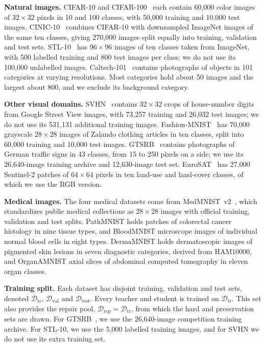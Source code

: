 \documentclass[10pt,journal,compsoc]{IEEEtran}
\theoremstyle{definition}
\begin{document}
\textbf{Natural images.} CIFAR-10 and
CIFAR-100~\cite{krizhevsky2009learning} each contain 60{,}000 color
images of $32\times32$ pixels in 10 and 100 classes, with 50{,}000
training and 10{,}000 test images. CINIC-10~\cite{darlow2018cinic} combines
CIFAR-10 with downsampled ImageNet images of the same ten classes,
giving 270{,}000 images split equally into training, validation and
test sets. STL-10~\cite{coates2011analysis} has $96\times96$ images of
ten classes taken from ImageNet, with 500 labelled training and 800
test images per class; we do not use its 100{,}000 unlabelled images.
Caltech-101~\cite{feifei2004learning} contains photographs of objects in
101 categories at varying resolutions. Most categories hold about 50
images and the largest about 800, and
we exclude its background category.

\textbf{Other visual domains.} SVHN~\cite{netzer2011reading} contains
$32\times32$ crops of house-number digits from Google Street View
images, with 73{,}257 training and 26{,}032 test images; we do not use
its 531{,}131 additional training images.
Fashion-MNIST~\cite{xiao2017fashion} has 70{,}000 grayscale
$28\times28$ images of Zalando clothing articles in ten classes, split
into 60{,}000 training and 10{,}000 test images.
GTSRB~\cite{stallkamp2012man} contains photographs of German traffic
signs in 43 classes, from 15 to 250 pixels on a side; we use its
26{,}640-image training archive and 12{,}630-image test set.
EuroSAT~\cite{helber2019eurosat} has 27{,}000 Sentinel-2
patches of $64\times64$ pixels in ten land-use and land-cover classes,
of which we use the RGB version.

\textbf{Medical images.} The four medical datasets come from
MedMNIST~v2~\cite{yang2023medmnist}, which standardizes public medical
collections as $28\times28$ images with official training, validation
and test splits. PathMNIST holds patches of colorectal cancer histology
in nine tissue types, and BloodMNIST microscope images of individual
normal blood cells in eight types. DermaMNIST holds dermatoscopic images
of pigmented skin lesions in seven diagnostic categories, derived from
HAM10000, and OrganAMNIST axial slices of abdominal computed tomography
in eleven organ classes.

\textbf{Training split.} Each dataset has disjoint training, validation
and test sets, denoted $\mathcal{D}_{\mathrm{tr}}$,
$\mathcal{D}_{\mathrm{val}}$ and $\mathcal{D}_{\mathrm{test}}$.
Every teacher and student is trained on $\mathcal{D}_{\mathrm{tr}}$.
This set also provides the repair pool,
$\mathcal{D}_{\mathrm{rep}}=\mathcal{D}_{\mathrm{tr}}$, from which the
hard and preservation sets are drawn. For GTSRB~\cite{stallkamp2012man},
we use the 26{,}640-image competition training
archive.
For STL-10, we use the 5{,}000 labelled training images, and for SVHN we
do not use its extra training set.
\end{document}
